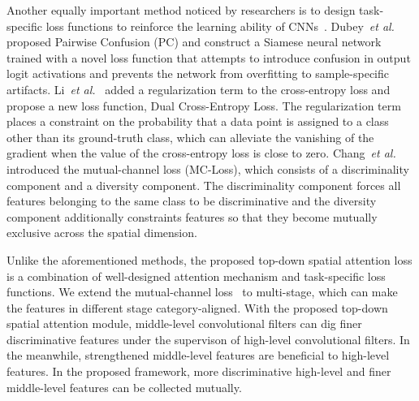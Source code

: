 \documentclass[journal]{IEEEtran}
\begin{document}
Another equally important method noticed by researchers is to design task-specific loss functions to reinforce the learning ability of CNNs~\cite{chang2020mc,dubey2018maximum, dubey2018pairwise, gao2020channel, sun2020fine,zhuang2020learning}. Dubey~\emph{et al.}~\cite{dubey2018pairwise} proposed Pairwise Confusion (PC) and construct a Siamese neural network trained with a novel loss function that attempts to introduce confusion in output logit activations and prevents the network from overfitting to sample-specific artifacts. Li~\emph{et al.}~\cite{li2019dual} added a regularization term to the cross-entropy loss and propose a new loss function, Dual Cross-Entropy Loss. The regularization term places a constraint on the probability that a data point is assigned to a class other than its ground-truth class, which can alleviate the vanishing of the gradient when the value of the cross-entropy loss is close to zero. Chang~\emph{et al.}~\cite{chang2020mc} introduced the mutual-channel loss (MC-Loss), which consists of a discriminality component and a diversity component. The discriminality component forces all features  belonging to the same class to be discriminative and the diversity component additionally constraints features so that they become mutually exclusive across the spatial dimension.

Unlike the aforementioned methods, the proposed top-down spatial attention loss is a combination of well-designed attention mechanism and task-specific loss functions. 
We extend the mutual-channel loss~\cite{chang2020mc} to multi-stage, which can make the features in different stage category-aligned.
With the proposed top-down spatial attention module, middle-level convolutional filters can dig finer discriminative features under the supervison of high-level convolutional filters. In the meanwhile, strengthened middle-level features are beneficial to high-level features. In the proposed framework, more discriminative high-level and finer middle-level features can be collected mutually.
\end{document}
